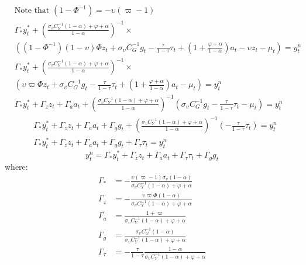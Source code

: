 \begin{align}
    &\text{Note that $(1 - \Phi^{-1}) = -\upsilon(\varpi - 1)$} \nonumber\\
    &\Gamma_* y^*_t + \left(\frac{\sigma_\upsilon C_Y^{-1}(1-\alpha) + \varphi + \alpha}{1-\alpha}\right)^{-1}\times\nonumber \\ 
        &\left((1 - \Phi^{-1}) (1-\upsilon)\Phi z_t + \sigma_\upsilon C_G^{-1} g_t - \frac{\tau}{1-\tau}\tau_t  + \left(1 + \frac{\varphi + \alpha}{1-\alpha}\right)a_t - \upsilon z_t -\mu_t \right)= y^n_t\\
    &\Gamma_* y^*_t + \left(\frac{\sigma_\upsilon C_Y^{-1}(1-\alpha) + \varphi + \alpha}{1-\alpha}\right)^{-1}\times\nonumber \\ 
        &\left(\upsilon \varpi \Phi z_t + \sigma_\upsilon C_G^{-1} g_t - \frac{\tau}{1-\tau}\tau_t  + \left(1 + \frac{\varphi + \alpha}{1-\alpha}\right)a_t -\mu_t \right)= y^n_t\\
    &\Gamma_* y^*_t + \Gamma_z z_t + \Gamma_a a_t + \left(\frac{\sigma_\upsilon C_Y^{-1}(1-\alpha) + \varphi + \alpha}{1-\alpha}\right)^{-1}\left(\sigma_\upsilon C_G^{-1} g_t - \frac{\tau}{1-\tau}\tau_t -\mu_t \right)= y^n_t
\end{align}
\begin{align}
    &\Gamma_* y^*_t + \Gamma_z z_t + \Gamma_a a_t + \Gamma_g g_t + \left(\frac{\sigma_\upsilon C_Y^{-1}(1-\alpha) + \varphi + \alpha}{1-\alpha}\right)^{-1}\left(- \frac{\tau}{1-\tau}\tau_t \right)= y^n_t\\
    &\Gamma_* y^*_t + \Gamma_z z_t + \Gamma_a a_t + \Gamma_g g_t + \Gamma_\tau \tau_t = y^n_t
\end{align}
\begin{equation}
    y^n_t = \Gamma_* y^*_t + \Gamma_z z_t + \Gamma_a a_t + \Gamma_\tau \tau_t + \Gamma_g g_t
\end{equation}
where:
\begin{align}
    \Gamma_* &= -\frac{\upsilon(\varpi - 1)\sigma_\upsilon(1-\alpha)}{\sigma_\upsilon C_Y^{-1} (1-\alpha) + \varphi + \alpha} \\
    \Gamma_z &= -\frac{\upsilon \varpi \Phi (1-\alpha)}{\sigma_\upsilon C_Y^{-1} (1-\alpha) + \varphi + \alpha} \\
    \Gamma_a &= \frac{1+\varpi}{\sigma_\upsilon C_Y^{-1} (1-\alpha) + \varphi + \alpha} \\
    \Gamma_g &= \frac{\sigma_\upsilon C_G^{-1} (1-\alpha)}{\sigma_\upsilon C_Y^{-1} (1-\alpha) + \varphi + \alpha} \\
    \Gamma_\tau &= -\frac{\tau}{1-\tau} \frac{1-\alpha}{\sigma_\upsilon C_Y^{-1} (1-\alpha) + \varphi + \alpha } \label{eq:appendix_natural_level_of_output_end}
\end{align}
\newpage